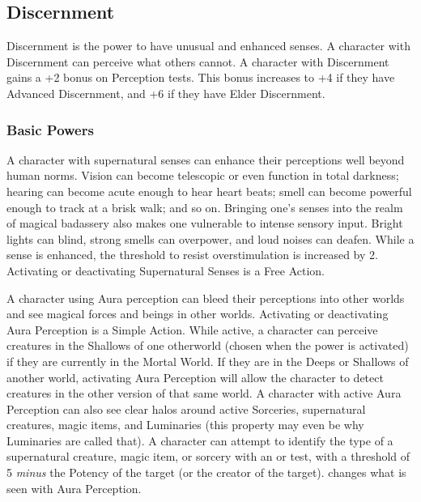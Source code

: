\subsection{Discernment}

Discernment is the power to have unusual and enhanced senses. A character with Discernment can perceive what others cannot. A character with Discernment gains a +2 bonus on Perception tests. This bonus increases to +4 if they have Advanced Discernment, and +6 if they have Elder Discernment.

\subsubsection{Basic Powers}

 A character with supernatural senses can enhance their perceptions well beyond human norms. Vision can become telescopic or even function in total darkness; hearing can become acute enough to hear heart beats; smell can become powerful enough to track at a brisk walk; and so on. Bringing one's senses into the realm of magical badassery also makes one vulnerable to intense sensory input. Bright lights can blind, strong smells can overpower, and loud noises can deafen. While a sense is enhanced, the threshold to resist overstimulation is increased by 2. Activating or deactivating Supernatural Senses is a Free Action.

 A character using Aura perception can bleed their perceptions into other worlds and see magical forces and beings in other worlds. Activating or deactivating Aura Perception is a Simple Action. While active, a character can perceive creatures in the Shallows of one otherworld (chosen when the power is activated) if they are currently in the Mortal World. If they are in the Deeps or Shallows of another world, activating Aura Perception will allow the character to detect creatures in the other version of that same world. A character with active Aura Perception can also see clear halos around active Sorceries, supernatural creatures, magic items, and Luminaries (this property may even be why Luminaries are called that). A character can attempt to identify the type of a supernatural creature, magic item, or sorcery with an  or  test, with a threshold of 5 \textit{minus} the Potency of the target (or the creator of the target).  changes what is seen with Aura Perception.

